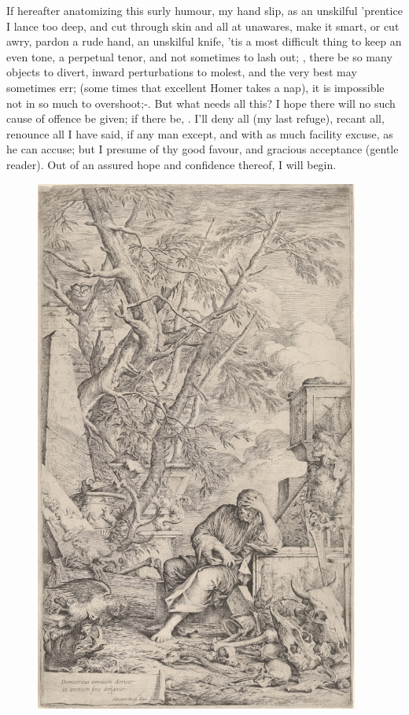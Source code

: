 {If hereafter anatomizing this surly humour, my hand slip, as an
unskilful 'prentice I lance too deep, and cut through skin and all at
unawares, make it smart, or cut awry, pardon a rude hand, an
unskilful knife, 'tis a most difficult thing to keep an even tone, a
perpetual tenor, and not sometimes to lash out; , there be so many objects to divert, inward perturbations
to molest, and the very best may sometimes err;  (some times that excellent Homer takes a nap), it is
impossible not in so much to overshoot;-. But what needs all this? I hope there will no such
cause of offence be given; if there be, . I'll deny all (my last refuge), recant all,
renounce all I have said, if any man except, and with as much facility
excuse, as he can accuse; but I presume of thy good favour, and
gracious acceptance (gentle reader). Out of an assured hope and
confidence thereof, I will begin.

\begin{figure}[p]
  \begingroup
  \centering
  \includegraphics[keepaspectratio,width=0.95\textwidth]{figures/Democritus-in-MeditationDP831915-small.jpg}
  \label{fig:democritusinmeditation}
\end{figure}
\clearpage{}
}
